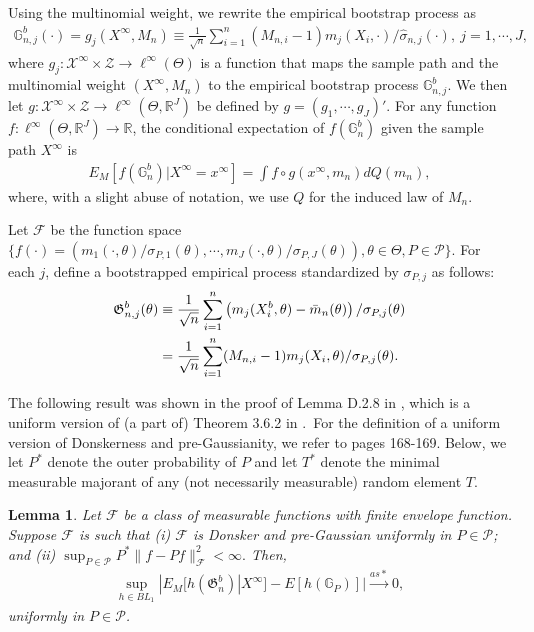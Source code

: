 \documentclass[letterpaper,11pt]{article}
\theoremstyle{myplain}
\newtheorem{lemma}{Lemma}[section]
\theoremstyle{mydefinition}
\theoremstyle{myremark}
\renewcommand{\cite}{\citet}
\numberwithin{equation}{section}
\numberwithin{figure}{section}
\begin{document}
\begin{appendices}
Using the multinomial weight, we rewrite the empirical bootstrap process as
\begin{align}
	\mathbb G^b_{n,j}(\cdot)=g_j(X^\infty,M_n)\equiv\frac{1}{\sqrt n}\sum_{i=1}^n(M_{n,i}-1)m_j(X_i,\cdot)/\hat\sigma_{n,j}(\cdot),~j=1,\cdots,J,\label{eq:defg}
\end{align}
where $g_j:\mathcal X^\infty\times \mathcal Z\to \ell^\infty(\Theta)$ is a function that maps the sample path and the multinomial weight $(X^\infty,M_n)$ to the empirical bootstrap process $\mathbb G^b_{n,j}$. 
We then let $g:\mathcal X^\infty\times \mathcal Z\to \ell^\infty(\Theta,\mathbb R^J)$ be defined by $g=(g_1,\cdots,g_J)'.$
 For any function $f:\ell^\infty(\Theta,\mathbb R^J)\to\mathbb R$, 
the conditional expectation of $f(\mathbb G^b_{n})$ given the sample path $X^\infty$ is
\begin{align}
	E_M[f(\mathbb G^b_{n})|X^\infty=x^\infty]=\int f\circ g(x^\infty,m_n)dQ(m_n),
\end{align}
where, with a slight abuse of notation, we use $Q$ for the induced law of $M_n$. 

Let $\mathcal F$ be the function space  $\{f(\cdot)=(m_1(\cdot,\theta)/\sigma_{P,1}(\theta),\cdots,m_J(\cdot,\theta)/\sigma_{P,J}(\theta)),\theta\in\Theta,P\in\mathcal P\}$. For each $j$, define a bootstrapped empirical process standardized by $\sigma_{P,j}$ as follows:
\begin{align}
	\mathfrak G^b_{n,j}(\theta)&\equiv \frac{1}{\sqrt n}\sum_{i=1}^n \left(m_j(X_i^b,\theta)-\bar m_n(\theta)\right)/\sigma_{P,j}(\theta)\notag\\
	&=\frac{1}{\sqrt n}\sum_{i=1}^n(M_{n,i}-1)m_j(X_i,\theta)/\sigma_{P,j}(\theta).
\end{align}


The following result was shown in the proof of Lemma D.2.8 in \cite{BCS14_misp}, which is a uniform version of (a part of) Theorem 3.6.2 in \cite{Vaart_Wellner2000aBK}.\ For the definition of a uniform version of Donskerness and pre-Gaussianity, we refer to \cite{Vaart_Wellner2000aBK} pages 168-169. Below, we let $P^*$ denote the outer probability of $P$ and let $T^*$ denote the minimal measurable majorant of any (not necessarily measurable) random  element $T$.
\begin{lemma}\label{lem:bootcons_standardized}
	Let $\mathcal F$ be a class of measurable functions with finite envelope function. Suppose $\mathcal F$ is such that (i) $\mathcal F$ is Donsker and pre-Gaussian uniformly in $P\in\mathcal P$; and (ii) $\sup_{P\in\mathcal P}P^*\|f-Pf\|^2_{\mathcal F}<\infty.$ Then,
\begin{align}
\sup_{h\in BL_1}|E_M[h(\mathfrak G^b_{n})|X^\infty]-E[h(\mathbb G_{P})]|\stackrel{as*}{\to}0,	
\end{align} 
uniformly in $P\in\mathcal P$.
\end{lemma}



\end{appendices}
\end{document}
